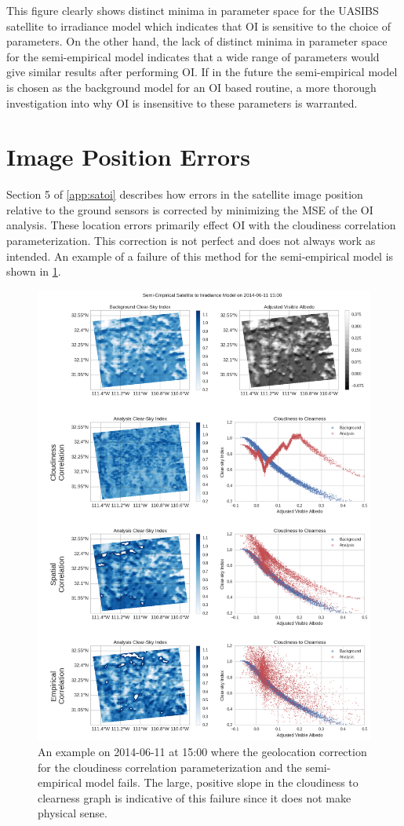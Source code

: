 This figure clearly shows distinct minima in parameter space for the
UASIBS satellite to irradiance model which indicates that  OI is
sensitive to the choice of parameters.
On the other hand, the lack of distinct minima in parameter space for
the semi-empirical model indicates that a wide range of parameters would
give similar results after performing OI.
If in the future the semi-empirical model is chosen as the background model
for an OI based routine, a more thorough investigation into why OI is
insensitive to these parameters is warranted.


\section{Image Position Errors}
Section 5 of \cref{app:satoi} describes how errors in the satellite
image position relative to the ground sensors is corrected by
minimizing the MSE of the OI analysis.
These location errors primarily effect OI with the cloudiness
correlation parameterization.
This correction is not perfect and does not always work as intended.
An example of a failure of this method for the semi-empirical model is
shown in \cref{fig:parallax_err}.


\begin{figure}[p]
\centering
\includegraphics[width=.9\textwidth]{figs/cld_to_clear_Semi-Empirical_2014-06-11.png}
\caption[An example of a failure of the geolocation correction]{
  An example on 2014-06-11 at 15:00 where the geolocation correction
  for the cloudiness correlation parameterization and the
  semi-empirical model fails. The large, positive slope in the
  cloudiness to clearness graph is indicative of this failure since it
  does not make physical sense.}
\label{fig:parallax_err}
\end{figure}

